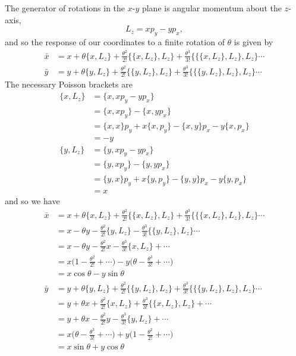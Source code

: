\documentclass[../principles-of-quantum-mechanics.tex]{subfiles}
\begin{document}
\begin{questions}
		\begin{solution}
			The generator of rotations in the $x$-$y$ plane is angular momentum about the $z$-axis,
			$$L_z = xp_y - yp_x,$$
			and so the response of our coordinates to a finite rotation of $\theta$ is given by
			\begin{align*}
				\bar{x} &= x + \theta\{x, L_z\} + \frac{\theta^2}{2!}\{\{x, L_z\}, L_z\} + \frac{\theta^3}{3!}\{\{\{x, L_z\}, L_z\}, L_z\}\cdots \\
				\bar{y} &= y + \theta\{y, L_z\} + \frac{\theta^2}{2!}\{\{y, L_z\}, L_z\} + \frac{\theta^3}{3!}\{\{\{y, L_z\}, L_z\}, L_z\}\cdots
			\end{align*}
			The necessary Poisson brackets are
			\begin{align*}
				\{x, L_z\} &= \{x, xp_y - yp_x\} \\
				&= \{x, xp_y\} - \{x, yp_x\} \\
				&= \{x, x\}p_y + x\{x, p_y\} - \{x, y\}p_x - y\{x, p_x\} \\
				&= -y \\
				\{y, L_z\} &= \{y, xp_y - yp_x\} \\
				&= \{y, xp_y\} - \{y, yp_x\} \\
				&= \{y, x\}p_y + x\{y, p_y\} - \{y, y\}p_x - y\{y, p_x\} \\
				&= x
			\end{align*}
			and so we have
			\begin{align*}
				\bar{x} &= x + \theta\{x, L_z\} + \frac{\theta^2}{2!}\{\{x, L_z\}, L_z\} + \frac{\theta^3}{3!}\{\{\{x, L_z\}, L_z\}, L_z\}\cdots \\
				&= x - \theta y - \frac{\theta^2}{2!}\{y, L_z\} - \frac{\theta^3}{3!}\{\{y, L_z\}, L_z\}\cdots \\
				&= x - \theta y - \frac{\theta^2}{2!}x - \frac{\theta^3}{3!}\{x, L_z\} + \cdots \\
				&= x\Big(1 - \frac{\theta^2}{2!} + \cdots\Big) - y\Big(\theta - \frac{\theta^3}{3!} + \cdots \Big) \\
				&= x\cos\theta - y\sin\theta \\
				\bar{y} &= y + \theta\{y, L_z\} + \frac{\theta^2}{2!}\{\{y, L_z\}, L_z\} + \frac{\theta^3}{3!}\{\{\{y, L_z\}, L_z\}, L_z\}\cdots \\
				&= y + \theta x + \frac{\theta^2}{2!}\{x, L_z\} + \frac{\theta^3}{3!}\{\{x, L_z\}, L_z\} + \cdots \\
				&= y + \theta x - \frac{\theta^2}{2!}y - \frac{\theta^3}{3!}\{y, L_z\} + \cdots \\
				&= x\Big(\theta - \frac{\theta^3}{3!} + \cdots\Big) + y\Big(1 - \frac{\theta^2}{2!} + \cdots\Big) \\
				&= x\sin\theta + y\cos\theta
			\end{align*}
		\end{solution}
		\setcounter{subsection}{3}
		\setcounter{question}{0}

\end{questions}
\end{document}
